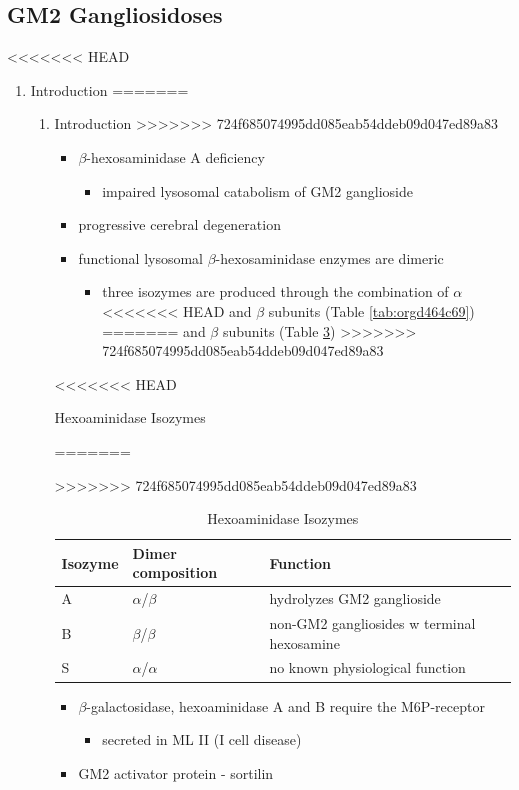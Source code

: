 \documentclass[fontsize=12pt]{scrartcl}
\begin{document}
\begin{enumerate}
\begin{enumerate}
\begin{enumerate}
\begin{enumerate}
\begin{table}[htbp]
\begin{enumerate}
\begin{enumerate}
\begin{table}[htbp]
\begin{enumerate}
\begin{itemize}
\begin{itemize}
\subsection{GM2 Gangliosidoses}
<<<<<<< HEAD
\label{sec:org3b3b218}
\begin{enumerate}
\item Introduction
\label{sec:org6dd9558}
=======
\label{sec:orgdbf82a9}
\begin{enumerate}
\item Introduction
\label{sec:org65cd2aa}
>>>>>>> 724f685074995dd085eab54ddeb09d047ed89a83
\begin{itemize}
\item \(\beta\)-hexosaminidase A deficiency 
\begin{itemize}
\item impaired lysosomal catabolism of GM2 ganglioside
\end{itemize}
\item progressive cerebral degeneration
\item functional lysosomal \(\beta\)-hexosaminidase enzymes are dimeric
\begin{itemize}
\item three isozymes are produced through the combination of \(\alpha\)
<<<<<<< HEAD
and \(\beta\) subunits (Table \ref{tab:orgd464c69})
=======
and \(\beta\) subunits (Table \ref{tab:orgebfae47})
>>>>>>> 724f685074995dd085eab54ddeb09d047ed89a83
\end{itemize}
\end{itemize}

\begin{table}[htbp]
<<<<<<< HEAD
\caption{\label{tab:orgd464c69}Hexoaminidase Isozymes}
=======
\caption{\label{tab:orgebfae47}
Hexoaminidase Isozymes}
>>>>>>> 724f685074995dd085eab54ddeb09d047ed89a83
\centering
\begin{tabular}{lll}
Isozyme & Dimer composition & Function\\
\hline
A & \(\alpha\)/\(\beta\) & hydrolyzes GM2 ganglioside\\
B & \(\beta\)/\(\beta\) & non-GM2 gangliosides w terminal hexosamine\\
S & \(\alpha\)/\(\alpha\) & no known physiological function\\
\end{tabular}
\end{table}

\begin{itemize}
\item \(\beta\)-galactosidase, hexoaminidase A and B require the M6P-receptor
\begin{itemize}
\item secreted in ML II (I cell disease)
\end{itemize}
\item GM2 activator protein - sortilin


\end{itemize}
\end{enumerate}
\end{enumerate}
\end{itemize}
\end{itemize}
\end{enumerate}
\end{table}
\end{enumerate}
\end{enumerate}
\end{table}
\end{enumerate}
\end{enumerate}
\end{enumerate}
\end{enumerate}
\end{document}
